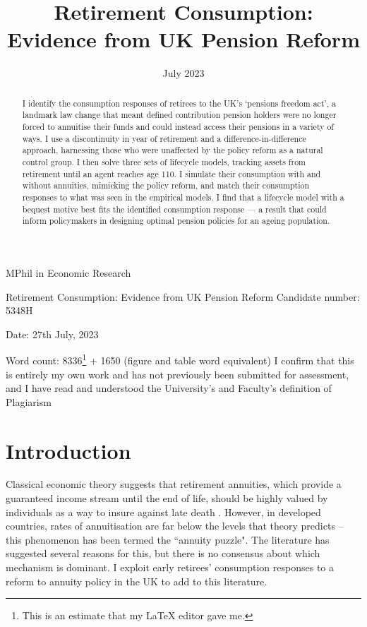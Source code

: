 \documentclass[12pt]{article}
\date{July 2023}
\title{Retirement Consumption: Evidence from UK Pension Reform}
\begin{document}
\begin{titlepage}
    \begin{center}

        \normalsize
        {MPhil in Economic Research}
        \vfill

        \huge
        Retirement Consumption: Evidence from UK Pension Reform
        \vfill
        \normalsize
        Candidate number: 5348H

        Date: 27th July, 2023

        Word count: 8336\footnote{This is an estimate that my LaTeX editor gave me.} + 1650 (figure and table word equivalent)
        \vfill
        I confirm that this is entirely my own work and has not previously been submitted for assessment, and I have read and understood the University’s and Faculty’s definition of Plagiarism
    \end{center}
\end{titlepage}
\newpage
\maketitle
\begin{abstract}
    I identify the consumption responses of retirees to the UK's `pensions
    freedom act', a landmark law change that meant defined contribution pension
    holders were no longer forced to annuitise their funds and could instead
    access their pensions in a variety of ways. I use a discontinuity in year of
    retirement and a difference-in-difference approach, harnessing those who
    were unaffected by the policy reform as a natural control group. I then
    solve three sets of lifecycle models, tracking assets from retirement until an
    agent reaches age 110. I simulate their consumption with and without
    annuities, mimicking the policy reform, and match their consumption
    responses to what was seen in the empirical models. I find that a lifecycle
    model with a bequest motive best fits the identified consumption response —
    a result that could inform policymakers in designing optimal pension
    policies for an ageing population.
\end{abstract}
\newpage
\tableofcontents
\newpage

\section{Introduction}
Classical economic theory suggests that retirement annuities, which provide a
guaranteed income stream until the end of life, should be highly valued by
individuals as a way to insure against late death \citep{yaari_65}. However, in
developed countries, rates of annuitisation are far below the levels that theory
predicts -- this phenomenon has been termed the ``annuity puzzle". The literature
has suggested several reasons for this, but there is no consensus about which
mechanism is dominant. I exploit early retirees' consumption responses to a
reform to annuity policy in the UK to add to this literature.
\end{document}
